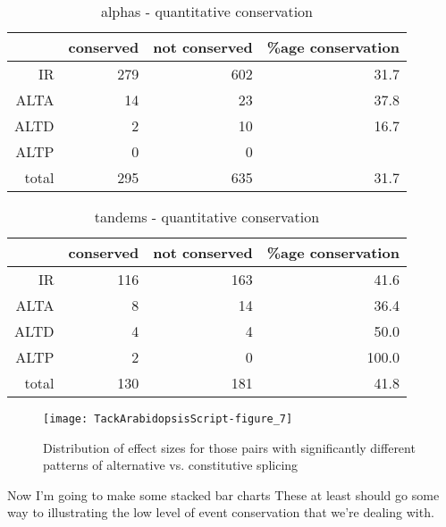 \documentclass{article}
\begin{document}
\begin{table}[ht]
\centering
\begin{tabular}{rrrr}
  \hline
 & conserved & not conserved & \%age conservation \\ 
  \hline
IR & 279 & 602 & 31.7 \\ 
  ALTA & 14 & 23 & 37.8 \\ 
  ALTD & 2 & 10 & 16.7 \\ 
  ALTP & 0 & 0 &  \\ 
  total & 295 & 635 & 31.7 \\ 
   \hline
\end{tabular}
\caption{alphas - quantitative conservation} 
\end{table}%
\begin{table}[ht]
\centering
\begin{tabular}{rrrr}
  \hline
 & conserved & not conserved & \%age conservation \\ 
  \hline
IR & 116 & 163 & 41.6 \\ 
  ALTA & 8 & 14 & 36.4 \\ 
  ALTD & 4 & 4 & 50.0 \\ 
  ALTP & 2 & 0 & 100.0 \\ 
  total & 130 & 181 & 41.8 \\ 
   \hline
\end{tabular}
\caption{tandems - quantitative conservation} 
\end{table}
\begin{figure}[h]
\begin{center}
\texttt{[image: TackArabidopsisScript-figure\_7]}
\end{center}
\caption{Distribution of effect sizes for those pairs with significantly different patterns of alternative vs. constitutive splicing}
\label{fig:fig7}
\end{figure}

Now I'm going to make some stacked bar charts These at least should go some way to illustrating the low level of event conservation that we're dealing with.
\end{document}

